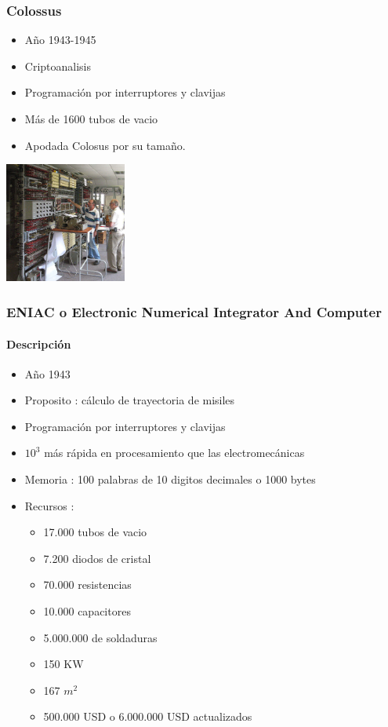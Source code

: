 \documentclass{beamer}
\begin{document}
\begin{frame}
	\frametitle{Colossus}
	\begin{minipage}[c]{7.5cm}
	\begin{itemize}
		\item Año 1943-1945
		\item Criptoanalisis
		\item Programación por interruptores y clavijas
		\item Más de 1600 tubos de vacio
		\item Apodada Colosus por su tamaño.
	\end{itemize}
	\end{minipage}
	\begin{minipage}[c]{4cm}
		\begin{center}
			\includegraphics[width=4cm]{ColossusRebuild_11.jpg}
		\end{center}
	\end{minipage}
\end{frame}

\begin{frame}
\frametitle{ENIAC o Electronic Numerical Integrator And Computer}
\framesubtitle{Descripción}
\begin{itemize}
	\item Año 1943
	\item Proposito : cálculo de trayectoria de misiles
	\item Programación por interruptores y clavijas
	\item $10^{3}$ más rápida en procesamiento que las electromecánicas
	\item Memoria : 100 palabras de 10 digitos decimales o 1000 bytes
	\item Recursos :
		\begin{itemize}
			\small
			\item 17.000 tubos de vacio
			\item 7.200 diodos de cristal
			\item 70.000 resistencias
			\item 10.000 capacitores
			\item 5.000.000 de soldaduras
			\item 150 KW
			\item 167 $m^{2}$
			\item 500.000 USD o 6.000.000 USD actualizados
		\end{itemize}
	\end{itemize}
\end{frame}
\end{document}
